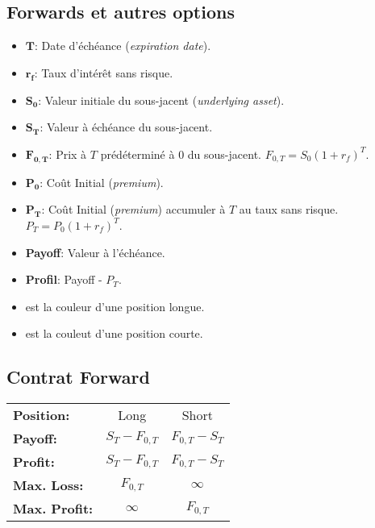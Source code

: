 \documentclass[10pt, french]{article}
\begin{document}
\small
\begin{multicols*}{3} %


\section*{Forwards et autres options}
\begin{itemize}[align=left,leftmargin=*]
    \item $\mathbf{T}$: Date d'échéance (\emph{expiration date}).
    \item $\mathbf{r_f}$: Taux d'intérêt sans risque.
    \item $\mathbf{S_0}$: Valeur initiale du sous-jacent (\emph{underlying asset}).
    \item $\mathbf{S_T}$: Valeur à échéance du sous-jacent.
    \item $\mathbf{F_{0,T}}$: Prix à $T$ prédéterminé à $0$ du sous-jacent. $F_{0,T}=S_0(1+r_f)^T$.
    \item $\mathbf{P_0}$: Coût Initial (\emph{premium}). %
    \item $\mathbf{P_T}$: Coût Initial (\emph{premium}) accumuler à $T$ au taux sans risque. $P_T = P_0(1+r_f)^T$.
    \item \textbf{Payoff}: Valeur à l'échéance.
    \item \textbf{Profil}: Payoff - $P_T$.
    \item {\color{LongColor} } est la couleur d'une position longue.
    \item {\color{ShortColor} } est la couleut d'une position courte.
\end{itemize}
\subsection*{Contrat Forward}
\begin{tabular}{>{\faAngleRight\hspace*{2mm}}lcc}
    \textbf{Position:}& Long & Short \\
    \textbf{Payoff:}& $S_T - F_{0,T}$ & $F_{0,T} - S_T$ \\
    \textbf{Profit:}& $S_T - F_{0,T}$ & $F_{0,T} - S_T$ \\
    \textbf{Max. Loss:}& $F_{0,T}$ & $\infty$ \\
    \textbf{Max. Profit:}& $\infty$ & $F_{0,T}$ \\
\end{tabular}  



\end{multicols*}
\end{document}

